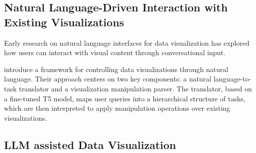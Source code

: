 \cite{Liu2021ADVISor}

\subsection{Natural Language-Driven Interaction with Existing Visualizations}

\cite{Wu2024LLMVis}

Early research on natural language interfaces for data visualization has explored how users can interact with visual content through conversational input.

\cite{Liu2024NLDriven} introduce a framework for controlling data visualizations through natural language. Their approach centers on two key components: a natural language-to-task translator and a visualization manipulation parser. The translator, based on a fine-tuned T5 model, maps user queries into a hierarchical structure of tasks, which are then interpreted to apply manipulation operations over existing visualizations.


\subsection{LLM assisted Data Visualization}

\cite{Choe2024EnhancingDataLiteracyLLMs}
\cite{Zeng2024AdvancingMLLMChartQA}
\cite{Sah2024GeneratingAnalyticsDataVizLLMs}
\cite{Li2024LinkQ}








